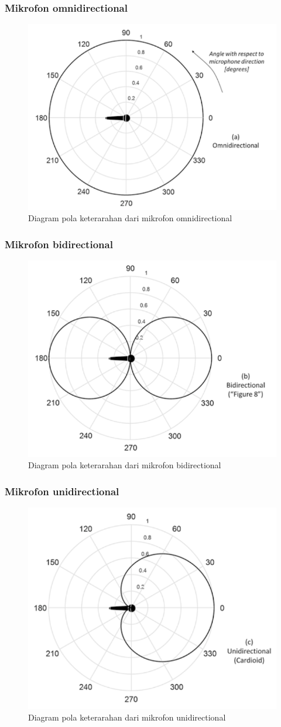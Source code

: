\documentclass[pdflatex,compress]{beamer}
\begin{document}
\begin{frame}
	\frametitle{Mikrofon omnidirectional}
	\begin{figure}
		\centering
		\includegraphics[width=0.6\linewidth]{img/img014a}
		\caption{Diagram pola keterarahan dari mikrofon omnidirectional}
		\label{fig:img014a}
	\end{figure}
\end{frame}

\begin{frame}
	\frametitle{Mikrofon bidirectional}
	\begin{figure}
		\centering
		\includegraphics[width=0.6\linewidth]{img/img014b}
		\caption{Diagram pola keterarahan dari mikrofon bidirectional}
		\label{fig:img014a}
	\end{figure}
\end{frame}

\begin{frame}
	\frametitle{Mikrofon unidirectional}
	\begin{figure}
		\centering
		\includegraphics[width=0.6\linewidth]{img/img014c}
		\caption{Diagram pola keterarahan dari mikrofon unidirectional}
		\label{fig:img014a}
	\end{figure}
\end{frame}
\end{document}
